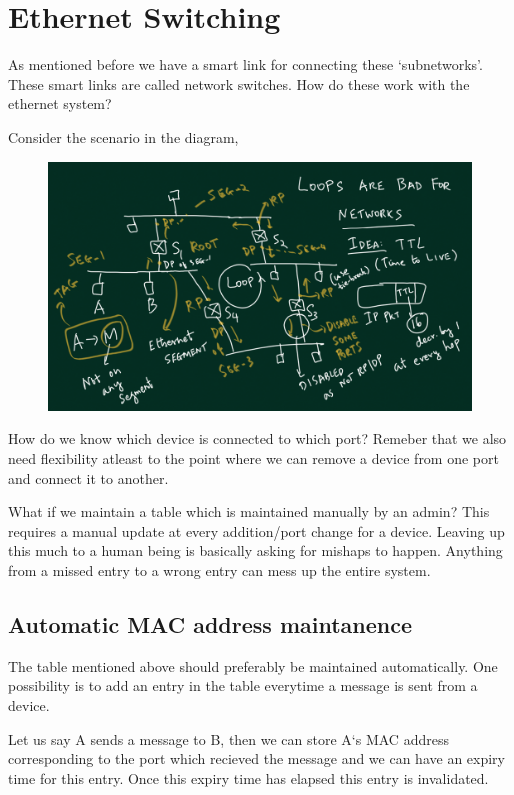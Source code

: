 \documentclass[12pt]{article}
\begin{document}
\section{Ethernet Switching}

As mentioned before we have a smart link for connecting these `subnetworks'. These smart links 
are called network switches. How do these work with the ethernet system? 

Consider the scenario in the diagram,

\begin{figure}
    \centering
\includegraphics[width=12cm]{Diagrams/loops_ethernet.png}
\end{figure}

How do we know which device is connected to which port? Remeber that we also 
need flexibility atleast to the point where we can remove a device from one port and connect it to another. 

What if we maintain a table which is maintained manually by an admin? This requires a manual 
update at every addition/port change for a device. Leaving up this much to a human being is basically asking for 
mishaps to happen. Anything from a missed entry to a wrong entry can mess up the entire system. 

\subsection{Automatic MAC address maintanence}
The table mentioned above should preferably be maintained automatically. One possibility is to 
add an entry in the table everytime a message is sent from a device. 

Let us say A sends a message to B, then we can store A`s MAC address corresponding to the port which recieved the message and 
we can have an expiry time for this entry. Once this expiry time has elapsed this entry is invalidated. 
\end{document}
